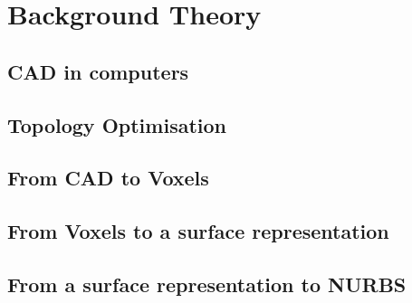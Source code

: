 \chapter{Background Theory}
\label{chapter:Background}

\section{CAD in computers}


\section{Topology Optimisation}

\section{From CAD to Voxels}



\section{From Voxels to a surface representation}


\section{From a surface representation to NURBS}



